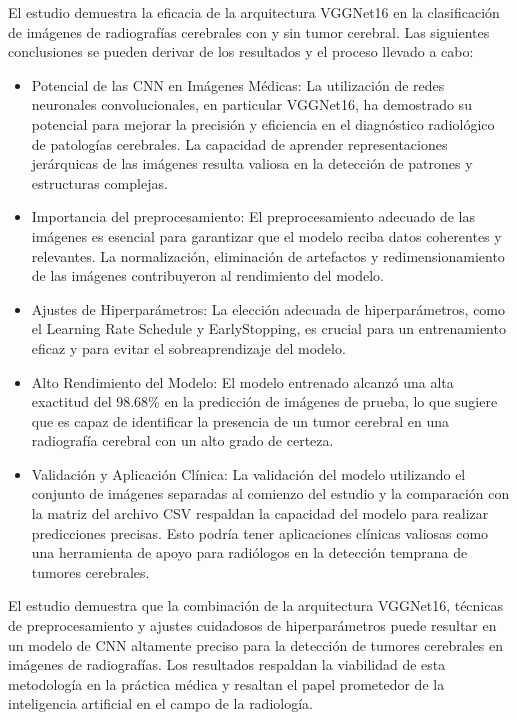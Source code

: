 \documentclass[12pt,twoside,titlepage]{ingenius}
\begin{document}
\begin{multicols}{2}
El estudio demuestra la eficacia de la arquitectura VGGNet16 en la clasificación de imágenes de radiografías cerebrales con y sin tumor cerebral. Las siguientes conclusiones se pueden derivar de los resultados y el proceso llevado a cabo:
\begin{itemize}
	\item Potencial de las CNN en Imágenes Médicas: La utilización de redes neuronales convolucionales, en particular VGGNet16, ha demostrado su potencial para mejorar la precisión y eficiencia en el diagnóstico radiológico de patologías cerebrales. La capacidad de aprender representaciones jerárquicas de las imágenes resulta valiosa en la detección de patrones y estructuras complejas.
	\item Importancia del preprocesamiento: El preprocesamiento adecuado de las imágenes es esencial para garantizar que el modelo reciba datos coherentes y relevantes. La normalización, eliminación de artefactos y redimensionamiento de las imágenes contribuyeron al rendimiento del modelo.
	\item Ajustes de Hiperparámetros: La elección adecuada de hiperparámetros, como el Learning Rate Schedule y EarlyStopping, es crucial para un entrenamiento eficaz y para evitar el sobreaprendizaje del modelo.
	\item Alto Rendimiento del Modelo: El modelo entrenado alcanzó una alta exactitud del 98.68\% en la predicción de imágenes de prueba, lo que sugiere que es capaz de identificar la presencia de un tumor cerebral en una radiografía cerebral con un alto grado de certeza.
	\item Validación y Aplicación Clínica: La validación del modelo utilizando el conjunto de imágenes separadas al comienzo del estudio y la comparación con la matriz del archivo CSV respaldan la capacidad del modelo para realizar predicciones precisas. Esto podría tener aplicaciones clínicas valiosas como una herramienta de apoyo para radiólogos en la detección temprana de tumores cerebrales.
\end{itemize}

El estudio demuestra que la combinación de la arquitectura VGGNet16, técnicas de preprocesamiento y ajustes cuidadosos de hiperparámetros puede resultar en un modelo de CNN altamente preciso para la detección de tumores cerebrales en imágenes de radiografías. Los resultados respaldan la viabilidad de esta metodología en la práctica médica y resaltan el papel prometedor de la inteligencia artificial en el campo de la radiología.




\end{multicols}
\end{document}
